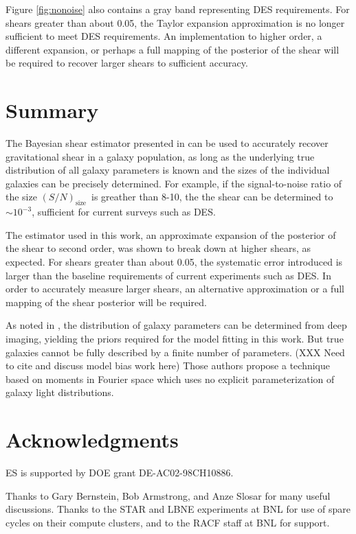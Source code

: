 \documentclass[12pt,preprint]{aastex}
\newcommand{\Tsn}{$(S/N)_{\textrm{size}}$}
\begin{document}
Figure \ref{fig:nonoise} also contains a gray band representing DES
requirements.  For shears greater than about 0.05, the Taylor expansion
approximation is no longer sufficient to meet DES requirements.  An
implementation to higher order, a different expansion, or perhaps a full
mapping of the posterior of the shear will be required to recover larger shears
to sufficient accuracy.

\section{Summary} \label{sec:summary}

The Bayesian shear estimator presented in \cite{ba13} can be used to accurately
recover gravitational shear in a galaxy population, as long as the underlying
true distribution of all galaxy parameters is known and the sizes of the
individual galaxies can be precisely determined.  For example, if the
signal-to-noise ratio of the size \Tsn\ is greather than 8-10, the 
the shear can be determined to $\sim 10^{-3}$, sufficient for current
surveys such as DES.

The estimator used in this work, an approximate expansion of the posterior of
the shear to second order, was shown to break down at higher shears, as
expected.  For shears greater than about 0.05, the systematic error introduced
is larger than the baseline requirements of current experiments such as DES.
In order to accurately measure larger shears, an alternative approximation
or a full mapping of the shear posterior will be required.

As noted in \cite{ba13}, the distribution of galaxy parameters can be
determined from deep imaging, yielding the priors required for the model
fitting in this work. But true galaxies cannot be fully described by a finite
number of parameters. (XXX Need to cite and discuss model bias work here) Those
authors propose a technique based on moments in Fourier space which uses no
explicit parameterization of galaxy light distributions.  

\section*{Acknowledgments}

ES is supported by DOE grant DE-AC02-98CH10886.

Thanks to Gary Bernstein, Bob Armstrong, and Anze Slosar for many useful
discussions.  Thanks to the STAR and LBNE experiments at BNL for use of spare
cycles on their compute clusters, and to the RACF staff at BNL for support.




\end{document}
